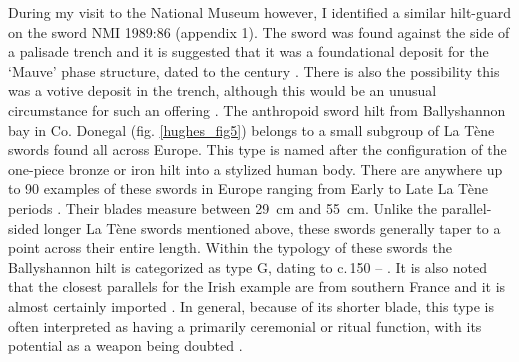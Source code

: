 During my visit to the National Museum however, I identified a similar hilt-guard on the sword NMI 1989:86 (appendix 1). 
The sword was found against the side of a palisade trench and it is suggested that it was a foundational deposit for the ‘Mauve’ phase structure, 
dated to the  century \AD \parencite[89]{Johnston2007}.
There is also the possibility this was a votive deposit in the trench, although this would be an unusual circumstance for such an offering \parencite[89]{Johnston2007}.
The anthropoid sword hilt from Ballyshannon bay in Co. Donegal (fig. \ref{hughes_fig5}) belongs to a small subgroup of La Tène swords found all across Europe. 
This type is named after the configuration of the one-piece bronze or iron hilt into a stylized human body. 
There are anywhere up to \num{90} examples of these swords in Europe ranging from Early to Late La Tène periods \parencite[193]{OBrien2009}. 
Their blades measure between \SI{29}{\cm} and \SI{55}{\cm}. 
Unlike the parallel-sided longer La Tène swords mentioned above, these swords generally taper to a point across their entire length. 
Within the typology of these swords the Ballyshannon hilt is categorized as type G, dating to c.\,150 \BC –  \parencite[193]{OBrien2009}. 
It is also noted that the closest parallels for the Irish example are from southern France and it is almost certainly imported 
\parencites[193]{OBrien2009}[143]{Raftery1994}[25]{CahillWilson2014}. 
In general, because of its shorter blade, this type is often interpreted as having a primarily ceremonial or ritual function, 
with its potential as a weapon being doubted \parencites[69]{Pleiner1993}[160]{Lejars2007}.

